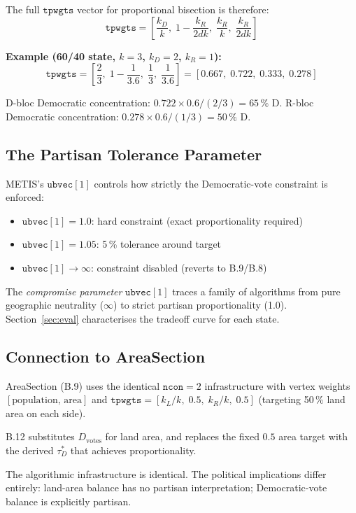 The full $\mathtt{tpwgts}$ vector for proportional bisection is therefore:
\begin{equation}
  \label{eq:tpwgts-formula}
  \boxed{\mathtt{tpwgts} = \left[\frac{k_D}{k},\; 1 - \frac{k_R}{2dk},\;
                                  \frac{k_R}{k},\; \frac{k_R}{2dk}\right]}
\end{equation}

\noindent\textbf{Example (60/40 state, $k=3$, $k_D=2$, $k_R=1$):}
\[
  \mathtt{tpwgts} = \left[\frac{2}{3},\; 1 - \frac{1}{3.6},\; \frac{1}{3},\; \frac{1}{3.6}\right]
                  = [0.667,\; 0.722,\; 0.333,\; 0.278]
\]

D-bloc Democratic concentration: $0.722 \times 0.6 / (2/3) = 65\,\%$ D.
R-bloc Democratic concentration: $0.278 \times 0.6 / (1/3) = 50\,\%$ D. \checkmark

\subsection{The Partisan Tolerance Parameter}

METIS's $\mathtt{ubvec}[1]$ controls how strictly the Democratic-vote constraint
is enforced:
\begin{itemize}
  \item $\mathtt{ubvec}[1] = 1.0$: hard constraint (exact proportionality required)
  \item $\mathtt{ubvec}[1] = 1.05$: 5\,\% tolerance around target
  \item $\mathtt{ubvec}[1] \to \infty$: constraint disabled (reverts to B.9/B.8)
\end{itemize}

The \emph{compromise parameter} $\mathtt{ubvec}[1]$ traces a family of algorithms
from pure geographic neutrality ($\infty$) to strict partisan proportionality (1.0).
Section~\ref{sec:eval} characterises the tradeoff curve for each state.

\subsection{Connection to AreaSection}

AreaSection (B.9) uses the identical $\mathtt{ncon}=2$ infrastructure with
vertex weights $[\text{population},\, \text{area}]$ and
$\mathtt{tpwgts} = [k_L/k,\; 0.5,\; k_R/k,\; 0.5]$ (targeting 50\,\%
land area on each side).

B.12 substitutes $D_{\text{votes}}$ for land area, and replaces the fixed
$0.5$ area target with the derived $\tau_D^*$ that achieves proportionality.

The algorithmic infrastructure is identical.
The political implications differ entirely:
land-area balance has no partisan interpretation; Democratic-vote balance
is explicitly partisan.

